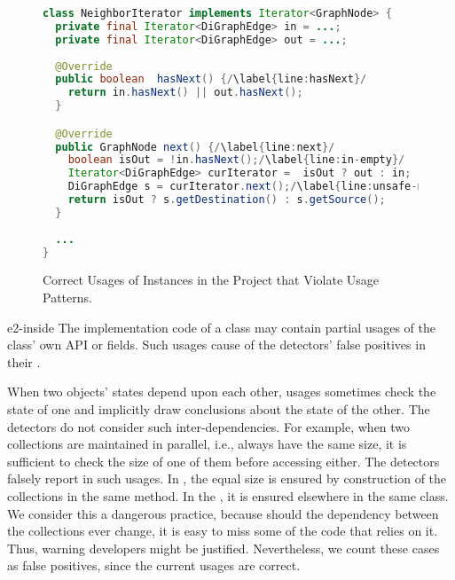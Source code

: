 \begin{figure}[tb]
  \begin{lstlisting}[language=java,breaklines=true,escapechar=/]
class NeighborIterator implements Iterator<GraphNode> {
  private final Iterator<DiGraphEdge> in = ...;
  private final Iterator<DiGraphEdge> out = ...;
  
  @Override
  public boolean  hasNext() {/\label{line:hasNext}/
    return in.hasNext() || out.hasNext();
  }

  @Override
  public GraphNode next() {/\label{line:next}/
    boolean isOut = !in.hasNext();/\label{line:in-empty}/
    Iterator<DiGraphEdge> curIterator =  isOut ? out : in;
    DiGraphEdge s = curIterator.next();/\label{line:unsafe-next}/
    return isOut ? s.getDestination() : s.getSource();
  }
  
  ...
}
  \end{lstlisting}
  \caption{Correct Usages of  Instances in the  Project that Violate Usage Patterns.}
  \label{lst:partial-usage}
\end{figure}

\begin{obs}{e2-inside}
  The implementation code of a class may contain partial usages of the class' own API or fields.
  Such usages cause  of the detectors' false positives in their .
\end{obs}

\vspace{0.03in}
When two objects' states depend upon each other, usages sometimes check the state of one and implicitly draw conclusions about the state of the other.
The detectors do not consider such inter-dependencies.
For example, when two collections are maintained in parallel, i.e., always have the same size, it is sufficient to check the size of one of them before accessing either.
The detectors falsely report  in such usages.
In , the equal size is ensured by construction of the collections in the same method.
In the , it is ensured elsewhere in the same class.
We consider this a dangerous practice, because should the dependency between the collections ever change, it is easy to miss some of the code that relies on it.
Thus, warning developers might be justified.
Nevertheless, we count these cases as false positives, since the current usages are correct.

